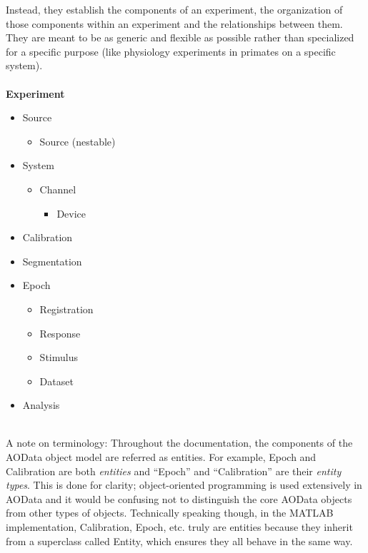 \documentclass[10pt]{exam}
\begin{document}
	Instead, they establish the components of an experiment, the organization of those components within an experiment and the relationships between them. They are meant to be as generic and flexible as possible rather than specialized for a specific purpose (like physiology experiments in primates on a specific system). 
	\\$\quad$\\
	\textbf{Experiment}
	\begin{itemize}
		\item Source
		\begin{itemize}
			\item Source (nestable)
		\end{itemize}
		\item System
		\begin{itemize}
			\item Channel
			\begin{itemize}
				\item Device
			\end{itemize}
		\end{itemize}
		\item Calibration
		\item Segmentation
		\item Epoch
		\begin{itemize}
			\item Registration
			\item Response
			\item Stimulus
			\item Dataset
		\end{itemize}
		\item Analysis
	\end{itemize}
	$\quad$\\
    A note on terminology: Throughout the documentation, the components of the AOData object model are referred  as entities. For example, Epoch and Calibration are both \textit{entities} and ``Epoch'' and ``Calibration'' are their \textit{entity types}. This is done for clarity; object-oriented programming is used extensively in AOData and it would be confusing not to distinguish the core AOData objects from other types of objects. Technically speaking though, in the MATLAB implementation, Calibration, Epoch, etc. truly are entities because they inherit from a superclass called Entity, which ensures they all behave in the same way. 
\end{document}
